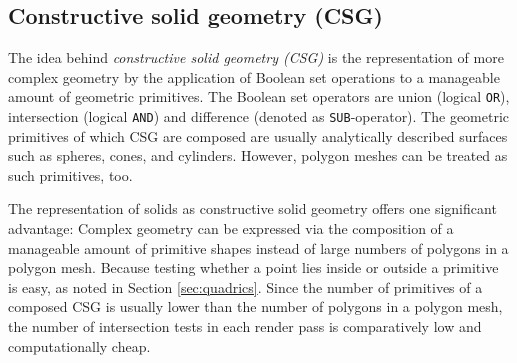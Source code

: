 \subsection{Constructive solid geometry (CSG)}
\label{subsec:csg_into}
The idea behind \emph{constructive solid geometry (CSG)} is the representation of more complex geometry by the application of Boolean set operations to a manageable amount of geometric primitives. The Boolean set operators are union (logical \texttt{OR}), intersection (logical \texttt{AND}) and difference (denoted as \texttt{SUB}-operator).
The geometric primitives of which CSG are composed are usually analytically described surfaces such as spheres, cones, and cylinders. However, polygon meshes can be treated as such primitives, too.   

The representation of solids as constructive solid geometry offers one significant advantage: Complex geometry can be expressed via the composition of a manageable amount of primitive shapes instead of large numbers of polygons in a polygon mesh. Because testing whether a point lies inside or outside a primitive is easy, as noted in Section \ref{sec:quadrics}. Since the number of primitives of a composed CSG is usually lower than the number of polygons in a polygon mesh, the number of intersection tests in each render pass is comparatively low and computationally cheap.

